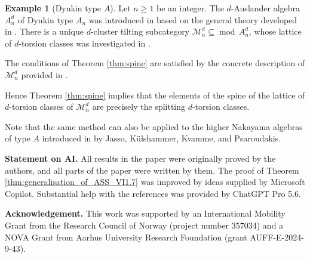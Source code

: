 \documentclass[12pt,reqno]{amsart}
\def\cM{\mathscr{M}}
\def\mod{\operatorname{mod}}
\numberwithin{equation}{section}
\theoremstyle{definition}
\newtheorem{Example}[Lemma]{Example}
\theoremstyle{theorem}
\theoremstyle{definition}
\begin{document}
\begin{Example}
[Dynkin type $A$]
\label{exa:Type_A}
Let $n \geqslant 1$ be an integer.  The $d$-Auslander algebra $A_n^d$ of Dynkin type $A_n$ was introduced in \cite[sec.\ 6.2]{Iyama_Cluster-tilting-for-higher-Auslander-algebras} based on the general theory developed in \cite{Iyama_Auslander-correspondence}.  There is a unique $d$-cluster tilting subcategory $\cM_n^d \subseteq \mod\,A_n^d$, whose lattice of $d$-torsion classes was investigated in \cite[sec.\ 5.5]{August-et-al_A-characterisation-of-higher-torsion-classes}.

The conditions of Theorem \ref{thm:spine} are satisfied by the concrete description of $\cM_n^d$ provided in \cite[thm./constr.\ 3.4 and thm.\ 3.6(3)]{Oppermann-Thomas_Higher-dimensional-cluster-combinatorics-and-representation-theory}.

Hence Theorem \ref{thm:spine} implies that the elements of the spine of the lattice of $d$-torsion classes of $\cM_n^d$ are precisely the splitting $d$-torsion classes.
\end{Example}


Note that the same method can also be applied to the higher Nakayama algebras of type $A$ introduced in \cite[def.\ 2.17]{Jasso-Kuelshammer-Psaroudakis-Kvamme_Higher_Nakayama_algebras_I} by Jasso, K\"{u}lshammer, Kvamme, and Psaroudakis.




\medskip
\noindent
{\bf Statement on AI.}
All results in the paper were originally proved by the authors, and all parts of the paper were written by them.  The proof of Theorem \ref{thm:generalisation_of_ASS_VI1.7} was improved by ideas supplied by Microsoft Copilot.  Substantial help with the references was provided by ChatGPT Pro 5.6.


\medskip
\noindent
{\bf Acknowledgement.}
This work was supported by an International Mobility Grant from the Research Council of Norway (project number 357034) and a NOVA Grant from Aarhus University Research Foundation (grant AUFF-E-2024-9-43).
\end{document}
